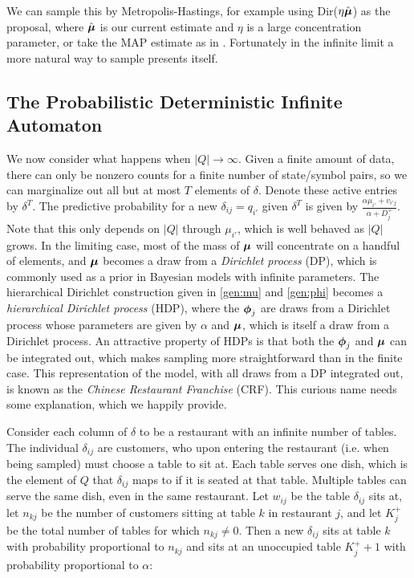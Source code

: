We can sample this by Metropolis-Hastings, for example using Dir($\eta\hat\bmu$) as the proposal, where $\hat\bmu$ is our current estimate and $\eta$ is a large concentration parameter, or take the MAP estimate as in \cite{Mackay1995}.  Fortunately in the infinite limit a more natural way to sample presents itself.
 
 \subsection{The Probabilistic Deterministic Infinite Automaton}
 
We now consider what happens when $|Q|\rightarrow\infty$.  Given a finite amount of data, there can only be nonzero counts for a finite number of state/symbol pairs, so we can marginalize out all but at most $T$ elements of $\delta$.  Denote these active entries by $\delta^T$.  The predictive probability for a new $\delta_{ij} = q_{i'}$ given $\delta^T$ is given by $\frac{\alpha\mu_{i'} + v_{i'j}}{\alpha + D^+_j}$.  Note that this only depends on $|Q|$ through $\mu_{i'}$, which is well behaved as $|Q|$ grows.  In the limiting case, most of the mass of $\bmu$ will concentrate on a handful of elements, and $\bmu$ becomes a draw from a {\em Dirichlet process} (DP), which is commonly used as a prior in Bayesian models with infinite parameters.  The hierarchical Dirichlet construction given in \eqref{gen:mu} and \eqref{gen:phi} becomes a {\em hierarchical Dirichlet process} (HDP), where the $\bphi_j$ are draws from a Dirichlet process whose parameters are given by $\alpha$ and $\bmu$, which is itself a draw from a Dirichlet process.  An attractive property of HDPs is that both the $\bphi_j$ and $\bmu$ can be integrated out, which makes sampling more straightforward than in the finite case.  This  representation of the model, with all draws from a DP integrated out, is known as the {\em Chinese Restaurant Franchise} (CRF).  This curious name needs some explanation, which we happily provide.
 
Consider each column of $\delta$ to be a restaurant with an infinite number of tables.  The individual $\delta_{ij}$ are customers, who upon entering the restaurant (i.e. when being sampled) must choose a table to sit at.  Each table serves one dish, which is the element of $Q$ that $\delta_{ij}$ maps to if it is seated at that table.  Multiple tables can serve the same dish, even in the same restaurant.  Let $w_{ij}$ be the table $\delta_{ij}$ sits at, let $n_{kj}$ be the number of customers sitting at table $k$ in restaurant $j$, and let $K^+_j$ be the total number of tables for which $n_{kj} \ne 0$.  Then a new $\delta_{ij}$ sits at table $k$ with probability proportional to $n_{kj}$ and sits at an unoccupied table $K^+_j + 1$ with probability proportional to $\alpha$:


